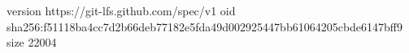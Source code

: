 version https://git-lfs.github.com/spec/v1
oid sha256:f51118ba4cc7d2b66deb77182e5fda49d002925447bb61064205cbde6147bff9
size 22004

